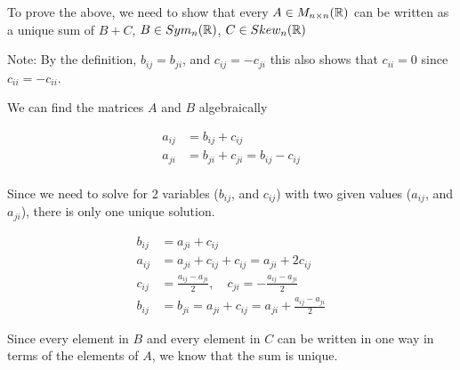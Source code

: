 \documentclass[12pt]{article} %
\begin{document}
\begin{homeworkProblem}


    To prove the above, we need to show that every $A \in M_{n \times n}(\mathbb{R})$ can be written as a unique sum of $B + C$, $B \in Sym_{n}(\mathbb{R})$, $C \in Skew_{n}(\mathbb{R})$

    Note: By the definition, $b_{ij} = b_{ji}$, and $c_{ij} = - c_{ji}$ this also shows that $c_{ii} = 0$ since $c_{ii} = -c_{ii}$.

    We can find the matrices $A$ and $B$ algebraically

    \begin{align*}
        a_{ij} & = b_{ij} + c_{ij}                   \\
        a_{ji} & = b_{ji} + c_{ji} = b_{ij} - c_{ij} \\
    \end{align*}

    Since we need to solve for 2 variables ($b_{ij}$, and $c_{ij}$) with two given values ($a_{ij}$, and $a_{ji}$), there is only one unique solution.

    \begin{align*}
        b_{ij} & = a_{ji} + c_{ij}                                                       \\
        a_{ij} & = a_{ji} + c_{ij} + c_{ij} = a_{ji} + 2 c_{ij}                          \\
        c_{ij} & = \frac{a_{ij} - a_{ji}}{2}, \quad c_{ji} = - \frac{a_{ij} - a_{ji}}{2} \\
        b_{ij} & = b_{ji} = a_{ji} + c_{ij} = a_{ji} + \frac{a_{ij} - a_{ji}}{2}
    \end{align*}

    Since every element in $B$ and every element in $C$ can be written in one way in terms of the elements of $A$, we know that the sum is unique.

\end{homeworkProblem}
\pagebreak
\end{document}
